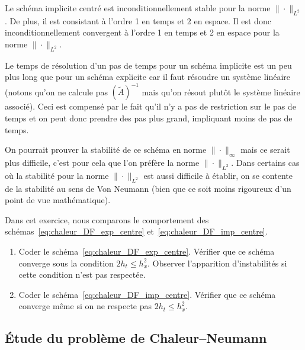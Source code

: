 \documentclass[12pt,a4paper,twoside]{article}
\begin{document}
\begin{proposition}[Convergence]
  Le sch\'ema implicite centr\'e est inconditionnellement stable pour la norme $\| \cdot \|_{L^2}$.
  De plus, il est consistant \`a l'ordre 1 en temps et 2 en espace.
  Il est donc inconditionnellement convergent \`a l'ordre 1 en temps et 2 en espace
  pour la norme $\| \cdot \|_{L^2}$.
\end{proposition}


\begin{remark}
  Le temps de r\'esolution d'un pas de temps pour un sch\'ema implicite est un peu plus long
  que pour un sch\'ema explicite car il faut r\'esoudre un syst\`eme lin\'eaire
  (notons qu'on ne calcule pas $(\widetilde{A})^{-1}$
  mais qu'on r\'esout plut\^ot le syst\`eme lin\'eaire associ\'e).
  Ceci est compens\'e par le fait qu'il n'y a pas de restriction sur le pas de temps et on
  peut donc prendre des pas plus grand, impliquant moins de pas de temps.
\end{remark}


\begin{remark}
  On pourrait prouver la stabilit\'e de ce sch\'ema en norme $\| \cdot \|_{\infty}$
  mais ce serait plus difficile, c'est pour cela que l'on pr\'ef\`ere la norme
  $\| \cdot \|_{L^2}$. Dans certains cas o\`u la stabilit\'e pour la norme $\| \cdot \|_{L^2}$
  est aussi difficile \`a \'etablir, on se contente de la stabilit\'e au sens de Von Neumann
  (bien que ce soit moins rigoureux d'un point de vue math\'ematique).
\end{remark}


\begin{exercise}
  \label{exo:chaleur_implicite}
  Dans cet exercice, nous comparons le comportement
  des sch\'emas~\eqref{eq:chaleur_DF_exp_centre} et~\eqref{eq:chaleur_DF_imp_centre}.
  \begin{enumerate}
  \item Coder le sch\'ema~\eqref{eq:chaleur_DF_exp_centre}.
    V\'erifier que ce sch\'ema converge sous la condition $2 h_t \leq h_x^2$.
    Observer l'apparition d'instabilit\'es si cette condition n'est pas respect\'ee.
  \item Coder le sch\'ema~\eqref{eq:chaleur_DF_imp_centre}.
    V\'erifier que ce sch\'ema converge m\^eme si on ne respecte pas
    $2 h_t \leq h_x^2$.
  \end{enumerate}
\end{exercise}


\subsection{\'Etude du probl\`eme de Chaleur--Neumann}
\end{document}
